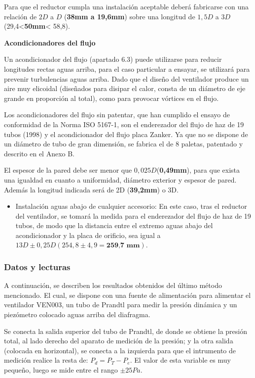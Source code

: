 Para que el reductor cumpla una instalación aceptable deberá fabricarse
con una relación de $2D$ a $D$ (\textbf{38mm a 19,6mm}) sobre una longitud
de $1,5D$ a $3D$ (29,4\textless{}\textbf{50mm}\textless{} 58,8).

\textbf{Acondicionadores del flujo}

Un acondicionador del flujo (apartado 6.3) puede utilizarse para reducir
longitudes rectas aguas arriba, para el caso particular a ensayar, se
utilizará para prevenir turbulencias aguas arriba. Dado que el diseño
del ventilador produce un aire muy elicoidal (diseñados para disipar el
calor, consta de un diámetro de eje grande en proporción al total), como
para provocar vórtices en el flujo.

Los acondicionadores del flujo sin patentar, que han cumplido el ensayo
de conformidad de la Norma ISO 5167-1, son el enderezador del flujo de
haz de 19 tubos (1998) y el acondicionador del flujo placa Zanker. Ya
que no se dispone de un diámetro de tubo de gran dimensión, se fabrica
el de 8 paletas, patentado y descrito en el Anexo B.

El espesor de la pared debe ser menor que $0,025D$(\textbf{0,49mm}), para
que exista una igualdad en cuanto a uniformidad, diámetro exterior y
espesor de pared. Además la longitud indicada será de 2D (\textbf{39,2mm}) o 3D.

\begin{itemize}
\item
  Instalación aguas abajo de cualquier accesorio: En este caso, tras el
  reductor del ventilador, se tomará la medida para el enderezador del
  flujo de haz de 19 tubos, de modo que la distancia entre el extremo
  aguas abajo del acondicionador y la placa de orificio, sea igual a $13D
  \pm 0,25D (254,8 \pm 4,9 = \textbf{259,7 mm})$.
\end{itemize}

\subsubsection{Datos y lecturas}\label{header-n345}

A continuación, se describen los resultados obtenidos del último método
mencionado. El cual, se dispone con una fuente de alimentación para
alimentar el ventilador VEN003, un tubo de Prandtl para medir la presión
dinámica y un piezómetro colocado aguas arriba del diafragma.

Se conecta la salida superior del tubo de Prandtl, de donde se obtiene
la presión total, al lado derecho del aparato de medición de la presión;
y la otra salida (colocada en horizontal), se conecta a la izquierda
para que el intrumento de medición realice la resta de:
\(P_d =P_T - P_e\). El valor de esta variable es muy pequeño, luego se
mide entre el rango \(\pm 25Pa\).

